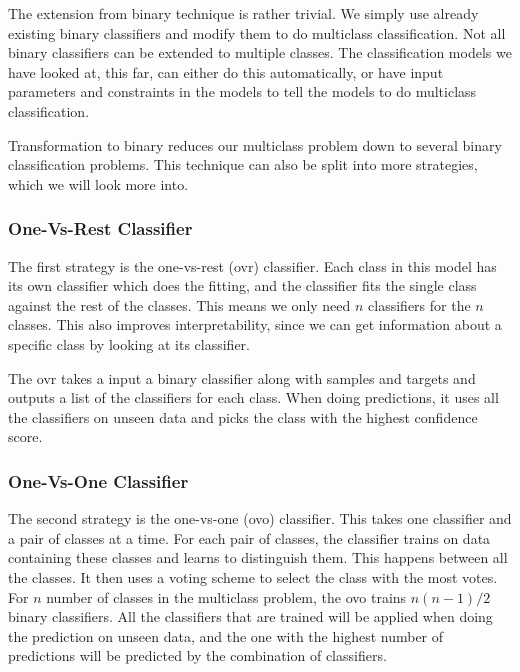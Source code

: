 \documentclass[a4paper, american, 12pt]{report}
\begin{document}
	The extension from binary technique is rather trivial. We simply use already existing binary classifiers and modify them to do multiclass classification. Not all binary classifiers can be extended to multiple classes. The classification models we have looked at, this far, can either do this automatically, or have input parameters and constraints in the models to tell the models to do multiclass classification.
	
	Transformation to binary reduces our multiclass problem down to several binary classification problems. This technique can also be split into more strategies, which we will look more into.  
	
	
	\subsubsection{One-Vs-Rest Classifier}
	\label{subsubsect:Theory-OvRModel}
	The first strategy is the one-vs-rest (\acrshort{ovr}) classifier. Each class in this model has its own classifier which does the fitting, and the classifier fits the single class against the rest of the classes. This means we only need $n$ classifiers for the $n$ classes. This also improves interpretability, since we can get information about a specific class by looking at its classifier.
	
	The \acrshort{ovr} takes a input a binary classifier along with samples and targets and outputs a list of the classifiers for each class. When doing predictions, it uses all the classifiers on unseen data and picks the class with the highest confidence score.

	
	\subsubsection{One-Vs-One Classifier}
	\label{subsubsect:Theory-OvOModel}
	The second strategy is the one-vs-one (\acrshort{ovo}) classifier. This takes one classifier and a pair of classes at a time. For each pair of classes, the classifier trains on data containing these classes and learns to distinguish them. This happens between all the classes. It then uses a voting scheme to select the class with the most votes. For $n$ number of classes in the multiclass problem, the \acrshort{ovo} trains $n(n-1)/2$ binary classifiers. All the classifiers that are trained will be applied when doing the prediction on unseen data, and the one with the highest number of predictions will be predicted by the combination of classifiers.
	
\end{document}
